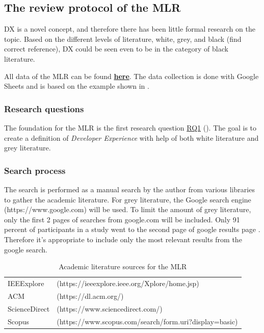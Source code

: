 \documentclass[english, 12pt, a4paper, sci, utf8, a-1b, online]{aaltothesis}
\begin{document}
\subsection{The review protocol of the MLR}

DX is a novel concept, and therefore there has been little formal research on the topic. Based on the different levels of literature, white, grey, and black \cite{guidelines-for-MLR} (find correct reference), DX could be seen even to be in the category of black literature.

\newcommand{\mlrdxlink}{https://docs.google.com/spreadsheets/d/1BLX4eQypAvxd3Gzft0s0rqUHdMYaKxPAbpZZ4dAvJqU/edit?usp=sharing}

All data of the MLR can be found \href{\mlrdxlink}{\textbf{here}}. The data collection is done with Google Sheets and is based on the example shown in \cite{guidelines-for-MLR}.

\subsubsection{Research questions}

The foundation for the MLR is the first research question \hyperref[RQ1]{RQ1} (\rqone). The goal is to create a definition of \textit{Developer Experience} with help of both white literature and grey literature.

\subsubsection{Search process}

The search is performed as a manual search by the author from various libraries to gather the academic literature. For grey literature, the Google search engine (https://www.google.com) will be used. To limit the amount of grey literature, only the first 2 pages of searches from google.com will be included. Only 91 percent of participants in a study went to the second page of google results page \cite{google-search}. Therefore it's appropriate to include only the most relevant results from the google search.

\begin{table}[H]
  \begin{tabular}{ l l }
    IEEExplore    & (https://ieeexplore.ieee.org/Xplore/home.jsp)          \\
    ACM           & (https://dl.acm.org/)                                  \\
    ScienceDirect & (https://www.sciencedirect.com/)                       \\
    Scopus        & (https://www.scopus.com/search/form.uri?display=basic)
  \end{tabular}
  \caption{Academic literature sources for the MLR}
\end{table}
\end{document}
